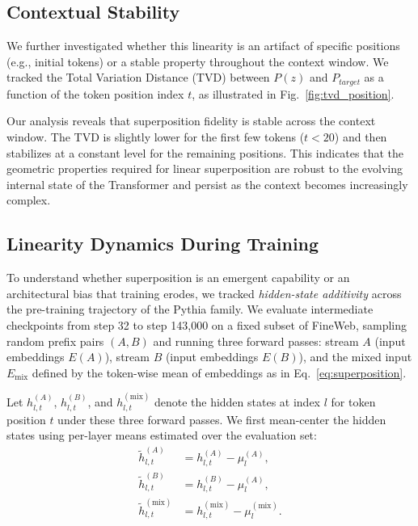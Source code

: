 \documentclass{article}
\theoremstyle{plain}
\theoremstyle{definition}
\theoremstyle{remark}
\begin{document}
\subsection{Contextual Stability}
We further investigated whether this linearity is an artifact of specific positions (e.g., initial tokens) or a stable property throughout the context window. We tracked the Total Variation Distance (TVD) between $P(z)$ and $P_{target}$ as a function of the token position index $t$, as illustrated in Fig.~\ref{fig:tvd_position}.

Our analysis reveals that superposition fidelity is stable across the context window. The TVD is slightly lower for the first few tokens ($t < 20$) and then stabilizes at a constant level for the remaining positions. This indicates that the geometric properties required for linear superposition are robust to the evolving internal state of the Transformer and persist as the context becomes increasingly complex.

\subsection{Linearity Dynamics During Training}
\label{subsec:training_dynamics}

To understand whether superposition is an emergent capability or an architectural bias that training erodes, we tracked \emph{hidden-state additivity} across the pre-training trajectory of the Pythia family. We evaluate intermediate checkpoints from step 32 to step 143{,}000 on a fixed subset of FineWeb, sampling random prefix pairs $(A,B)$ and running three forward passes: stream $A$ (input embeddings $E(A)$), stream $B$ (input embeddings $E(B)$), and the mixed input $E_{\text{mix}}$ defined by the token-wise mean of embeddings as in Eq.~\eqref{eq:superposition}.

Let $h^{(A)}_{l,t}$, $h^{(B)}_{l,t}$, and $h^{(\text{mix})}_{l,t}$ denote the hidden states at index $l$ for token position $t$ under these three forward passes. We first mean-center the hidden states using per-layer means estimated over the evaluation set:
\begin{equation}
\begin{aligned}
\tilde h^{(A)}_{l,t} &= h^{(A)}_{l,t} - \mu^{(A)}_{l}, \\
\tilde h^{(B)}_{l,t} &= h^{(B)}_{l,t} - \mu^{(A)}_{l}, \\
\tilde h^{(\text{mix})}_{l,t} &= h^{(\text{mix})}_{l,t} - \mu^{(\text{mix})}_{l}.
\end{aligned}
\label{eq:centering}
\end{equation}
\end{document}
